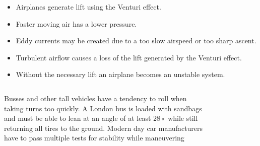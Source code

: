 \begin{frame}
	\begin{itemize}
		\item Airplanes generate lift using the Venturi effect.
		\item Faster moving air has a lower pressure.
		\item Eddy currents may be created due to a too slow airspeed or too sharp ascent.
		\item Turbulent airflow causes a loss of the lift generated by the Venturi effect.
		\item Without the necessary lift an airplane becomes an unstable system.
	\end{itemize}
\end{frame}
\begin{frame}
	\begin{columns}
		\begin{column}{0.6\textwidth}
			Busses and other tall vehicles have a tendency to roll when taking turns too quickly.
			A London bus is loaded with sandbags and must be able to lean at an angle of at least $28 \circ$ while still returning all tires to the ground.
			Modern day car manufacturers have to pass multiple tests for stability while maneuvering
		\end{column}
		\begin{column}{0.4\textwidth}
			\begin{figure}
				\centering
				\includegraphics[width=0.8\linewidth]{Images/discrete_time_systems_32}
				\label{fig:discrete_time_systems_32}
			\end{figure}
		\end{column}
	\end{columns}
\end{frame}
